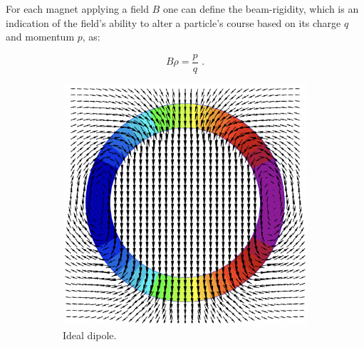 For each magnet applying a field \(B\) one can define the \gls{beam-rigidity}, which is an indication of the field's ability to alter a particle's course based on its charge \(q\) and momentum \(p\), as:

\begin{equation}
    B \rho = \frac{p}{q} \text{ .}
    \label{equation:magnetic_rigidity}
\end{equation}

\begin{figure}[!hbt]
    \centering
    \begin{subfigure}[b]{0.45\textwidth}
        \centering
        \includegraphics[width=\textwidth]{Figures/Beam_Dynamics_Theory/ideal_dipole_cos_theta.png}
        \caption{Ideal dipole.}
        \label{fig:ideal_dipole}
    \end{subfigure}
    \hfill
    \begin{subfigure}[b]{0.45\textwidth}
        \centering

\end{subfigure}
\end{figure}
